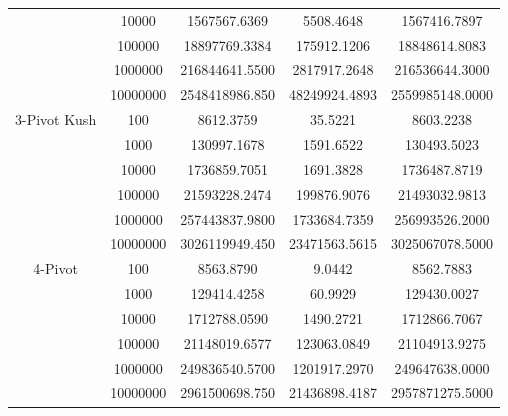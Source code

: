 \documentclass[a4paper,oneside,12pt]{book}
\begin{document}
\begin{center}
\begin{tabular}{ |c c | c c c| }
                        & 10000    & 1567567.6369   & 5508.4648     & 1567416.7897 \\
                        & 100000   & 18897769.3384  & 175912.1206   & 18848614.8083 \\
                        & 1000000  & 216844641.5500 & 2817917.2648  & 216536644.3000 \\
                        & 10000000 & 2548418986.850 & 48249924.4893 & 2559985148.0000 \\
        \hline
        3-Pivot Kush    & 100      & 8612.3759      & 35.5221       & 8603.2238 \\
                        & 1000     & 130997.1678    & 1591.6522     & 130493.5023 \\
                        & 10000    & 1736859.7051   & 1691.3828     & 1736487.8719 \\
                        & 100000   & 21593228.2474  & 199876.9076   & 21493032.9813 \\
                        & 1000000  & 257443837.9800 & 1733684.7359  & 256993526.2000 \\
                        & 10000000 & 3026119949.450 & 23471563.5615 & 3025067078.5000 \\
        \hline
        4-Pivot         & 100      & 8563.8790      & 9.0442        & 8562.7883 \\
                        & 1000     & 129414.4258    & 60.9929       & 129430.0027 \\
                        & 10000    & 1712788.0590   & 1490.2721     & 1712866.7067 \\
                        & 100000   & 21148019.6577  & 123063.0849   & 21104913.9275 \\
                        & 1000000  & 249836540.5700 & 1201917.2970  & 249647638.0000 \\
                        & 10000000 & 2961500698.750 & 21436898.4187 & 2957871275.5000 \\
        \hline
    \end{tabular}


\end{center}
\end{document}
